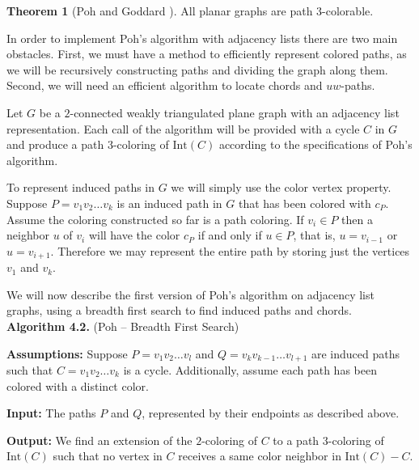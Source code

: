 \documentclass[letterpaper, 12pt]{article}
\theoremstyle{definition}
\theoremstyle{definition}
\theoremstyle{thm}
\newtheorem{theorem}{Theorem}[section]
\theoremstyle{definition}
\begin{document}
\begin{theorem}[Poh \cite{poh} and Goddard \cite{goddard}]
All planar graphs are path $3$-colorable.
\end{theorem}

In order to implement Poh's algorithm with adjacency lists there are two main
obstacles. First, we must have a method to efficiently represent colored paths,
as we will be recursively constructing paths and dividing the graph along them.
Second, we will need an efficient algorithm to locate chords and $uw$-paths.

Let $G$ be a $2$-connected weakly triangulated plane graph with an adjacency
list representation. Each call of the algorithm will be provided with a cycle
$C$ in $G$ and produce a path $3$-coloring of $\text{Int}(C)$ according to the
specifications of Poh's algorithm.

To represent induced paths in $G$ we will simply use the color vertex property.
Suppose $P=v_1v_2\ldots v_k$ is an induced path in $G$ that has been colored
with $c_P$. Assume the coloring constructed so far is a path coloring. If
$v_i\in P$ then a neighbor $u$ of $v_i$ will have the color $c_P$ if and only if
$u\in P$, that is, $u=v_{i-1}$ or $u=v_{i+1}$. Therefore we may represent the
entire path by storing just the vertices $v_1$ and $v_k$. 

We will now describe the first version of Poh's algorithm on adjacency list
graphs, using a breadth first search to find induced paths and chords.\\

\noindent\textbf{Algorithm 4.2.} (Poh -- Breadth First Search)

\noindent\textbf{Assumptions:} Suppose $P=v_1v_2\ldots v_l$ and
$Q=v_kv_{k-1}\ldots v_{l+1}$ are induced
paths such that $C=v_1v_2\ldots v_k$ is a cycle. Additionally, assume each
path has been colored with a distinct color.

\noindent\textbf{Input:} The paths $P$ and $Q$, represented by their endpoints
as described above.

\noindent\textbf{Output:} We find an extension of the $2$-coloring of $C$ to
a path $3$-coloring of $\text{Int}(C)$ such that
no vertex in $C$ receives a same color neighbor in $\text{Int}(C)-C$.
\end{document}
